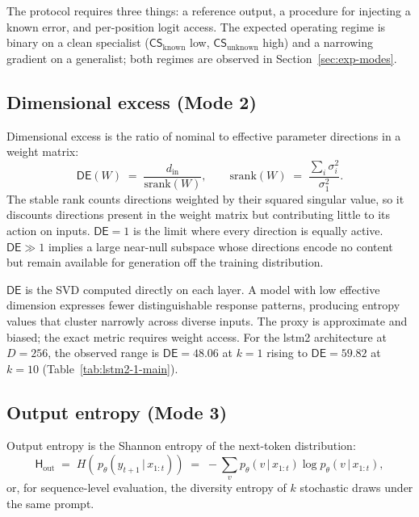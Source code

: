 \documentclass[11pt,a4paper]{article}
\newcommand{\CS}{\mathsf{CS}}
\newcommand{\DE}{\mathsf{DE}}
\newcommand{\Hout}{\mathsf{H}_{\mathrm{out}}}
\newcommand{\srank}{\mathrm{srank}}
\begin{document}
The protocol requires three things: a reference output, a procedure for injecting a known error, and per-position logit access. The expected operating regime is binary on a clean specialist ($\CS_{\mathrm{known}}$ low, $\CS_{\mathrm{unknown}}$ high) and a narrowing gradient on a generalist; both regimes are observed in Section~\ref{sec:exp-modes}.


\subsection{Dimensional excess (Mode 2)}
\label{sec:protocol-de}

Dimensional excess is the ratio of nominal to effective parameter directions in a weight matrix:
\begin{equation}
\label{eq:de}
\DE(W) \;=\; \frac{d_{\mathrm{in}}}{\srank(W)},
\qquad
\srank(W) \;=\; \frac{\sum_i \sigma_i^2}{\sigma_1^2}.
\end{equation}
The stable rank counts directions weighted by their squared singular value, so it discounts directions present in the weight matrix but contributing little to its action on inputs. $\DE = 1$ is the limit where every direction is equally active. $\DE \gg 1$ implies a large near-null subspace whose directions encode no content but remain available for generation off the training distribution.

$\DE$ is the SVD computed directly on each layer. A model with low effective dimension expresses fewer distinguishable response patterns, producing entropy values that cluster narrowly across diverse inputs. The proxy is approximate and biased; the exact metric requires weight access. For the lstm2 architecture at $D = 256$, the observed range is $\DE = 48.06$ at $k = 1$ rising to $\DE = 59.82$ at $k = 10$ (Table~\ref{tab:lstm2-1-main}).


\subsection{Output entropy (Mode 3)}
\label{sec:protocol-h}

Output entropy is the Shannon entropy of the next-token distribution:
\begin{equation}
\label{eq:h}
\Hout \;=\; H\!\left(\, p_\theta(y_{t+1} \,|\, x_{1:t})\right)
\;=\; -\sum_v p_\theta(v \,|\, x_{1:t}) \log p_\theta(v \,|\, x_{1:t}),
\end{equation}
or, for sequence-level evaluation, the diversity entropy of $k$ stochastic draws under the same prompt.
\end{document}
